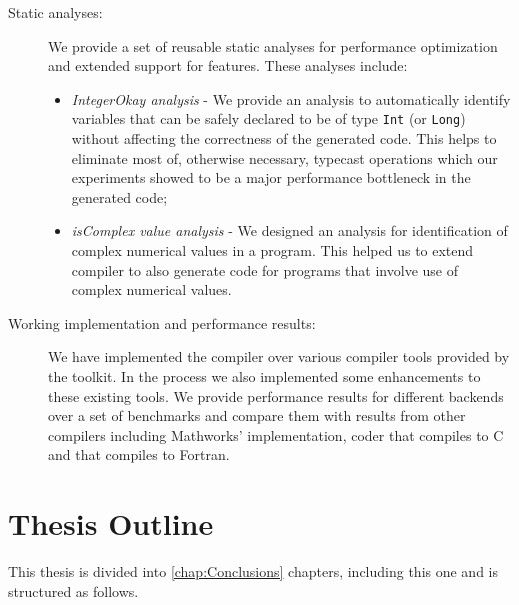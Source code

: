 \begin{description}
\item[Static analyses:] We provide a set of reusable static analyses for
performance optimization and extended support for \matlab features. These
analyses include: \begin{itemize} \item \emph{IntegerOkay analysis} - We provide
an analysis to automatically identify variables that can be safely declared to
be of type \texttt{Int} (or \texttt{Long}) without affecting the correctness of
the generated \xten code. This helps to eliminate most of, otherwise necessary,
typecast operations which our experiments showed to be a major performance
bottleneck in the generated code; \item \emph{isComplex value analysis} - We
designed an analysis for identification of complex numerical values in a \matlab
program. This helped us to extend \mixten compiler to also generate \xten code
for \matlab programs that involve use of complex numerical values.
\end{itemize}
  
\item[Working implementation and performance results:] We have implemented the
\mixten compiler over various \matlab compiler tools provided by the \mclab
toolkit.  In the process we also implemented some enhancements to these existing
tools.  We provide performance results for different \xten backends over a set
of benchmarks and compare them with results from other \matlab compilers
including Mathworks' \matlab implementation, \matlab coder that compiles \matlab
to C and \mctwofor that compiles \matlab to Fortran.

\end{description}

\section{Thesis Outline}

This thesis is divided into \ref{chap:Conclusions} chapters, including this one
and is structured as follows.

